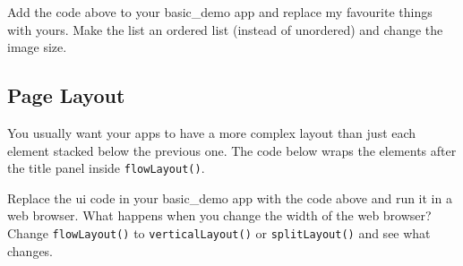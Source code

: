 \documentclass[
  oneside]{book}
\newenvironment{Shaded}{\begin{snugshade}}{\end{snugshade}}
\newcommand{\AttributeTok}[1]{\textcolor[rgb]{0.77,0.63,0.00}{#1}}
\newcommand{\FunctionTok}[1]{\textcolor[rgb]{0.00,0.00,0.00}{#1}}
\newcommand{\NormalTok}[1]{#1}
\newcommand{\OtherTok}[1]{\textcolor[rgb]{0.56,0.35,0.01}{#1}}
\newcommand{\SpecialCharTok}[1]{\textcolor[rgb]{0.00,0.00,0.00}{#1}}
\newcommand{\StringTok}[1]{\textcolor[rgb]{0.31,0.60,0.02}{#1}}
\begin{document}
\begin{try}
Add the code above to your basic\_demo app and replace my favourite things with yours. Make the list an ordered list (instead of unordered) and change the image size.

\end{try}

\hypertarget{page-layout}{%
\subsection{Page Layout}\label{page-layout}}

You usually want your apps to have a more complex layout than just each element stacked below the previous one. The code below wraps the elements after the title panel inside \texttt{flowLayout}\texttt{()}.

\begin{Shaded}
\end{Shaded}

\begin{try}
Replace the ui code in your basic\_demo app with the code above and run it in a web browser. What happens when you change the width of the web browser? Change \texttt{flowLayout}\texttt{()} to \texttt{verticalLayout}\texttt{()} or \texttt{splitLayout}\texttt{()} and see what changes.

\end{try}
\end{document}
